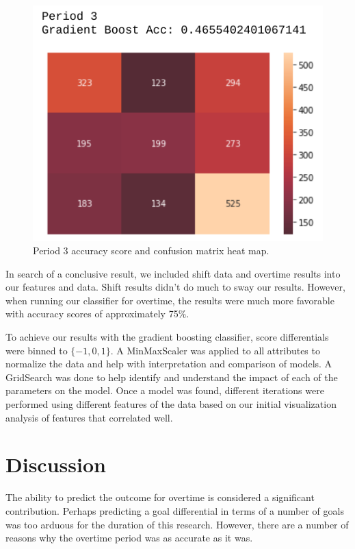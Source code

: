 \documentclass[twocolumn,letterpaper,12pt,notitlepage]{article}
\begin{document}
\begin{figure}[htp]
\centering
\includegraphics[width=\linewidth]{period3cm}
\caption{Period 3 accuracy score and confusion matrix heat map.}
\label{fig:5}
\end{figure}

In search of a conclusive result, we included shift data and overtime results into our features and data. Shift results didn't do much to sway our results. However, when running our classifier for overtime, the results were much more favorable with accuracy scores of approximately 75$\%$. 

To achieve our results with the gradient boosting classifier, score differentials were binned to $\{-1,0,1\}$. A MinMaxScaler was applied to all attributes to normalize the data and help with interpretation and comparison of models.  A GridSearch was done to help identify and understand the impact of each of the parameters on the model. Once a model was found, different iterations were performed using different features of the data based on our initial visualization analysis of features that correlated well. 

\section{Discussion}
The ability to predict the outcome for overtime is considered a significant contribution. Perhaps predicting a goal differential in terms of a number of goals was too arduous for the duration of this research. However, there are a number of reasons why the overtime period was as accurate as it was. 
\end{document}
